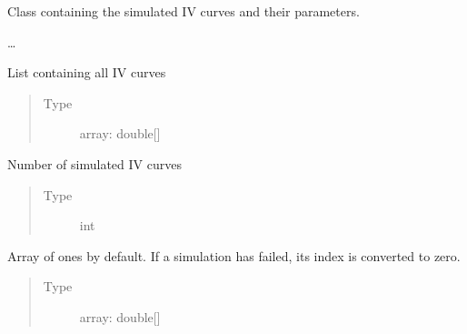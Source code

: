 \documentclass[letterpaper,10pt,english,openany, oneside]{sphinxmanual}
\begin{document}
\begin{fulllineitems}
\label{\detokenize{index:fompy.fds.FompyDataset}}
Class containing the simulated IV curves and their parameters.

…

\begin{fulllineitems}
\label{\detokenize{index:fompy.fds.FompyDataset.dataset}}
List containing all IV curves
\begin{quote}\begin{description}
\item[{Type}] \leavevmode
array: double{[}{]}

\end{description}\end{quote}

\end{fulllineitems}


\begin{fulllineitems}
\label{\detokenize{index:fompy.fds.FompyDataset.n_sims}}
Number of simulated IV curves
\begin{quote}\begin{description}
\item[{Type}] \leavevmode
int

\end{description}\end{quote}

\end{fulllineitems}


\begin{fulllineitems}
\label{\detokenize{index:fompy.fds.FompyDataset.sanity_array}}
Array of ones by default. If a simulation has failed, its index is converted to zero.
\begin{quote}\begin{description}
\item[{Type}] \leavevmode
array: double{[}{]}

\end{description}\end{quote}


\end{fulllineitems}
\end{fulllineitems}
\end{document}
